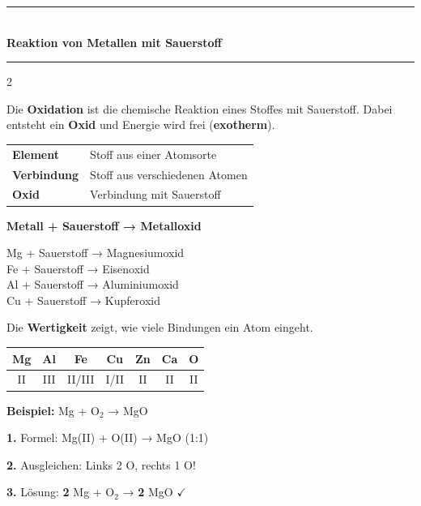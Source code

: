 \documentclass[9pt, a4paper]{article}
\newcommand{\seitentitel}[1]{%
    \noindent\textcolor{fachfarbe}{\rule{\textwidth}{1.5pt}}\\[-0.1em]
    {\Large\bfseries\textcolor{fachfarbe}{#1}}\\[-0.3em]
    \textcolor{fachfarbe}{\rule{\textwidth}{0.4pt}}
    \vspace{0.3em}
}
\newcommand{\abschnitt}[1]{%
    \vspace{6pt}%
    \noindent{\normalsize\bfseries\textcolor{fachfarbe}{#1}}%
    \vspace{2pt}%
    \nopagebreak[4]%
}
\begin{document}

\seitentitel{Reaktion von Metallen mit Sauerstoff}

\begin{multicols}{2}

\abschnitt{Was ist Oxidation?}

Die \textbf{Oxidation} ist die chemische Reaktion eines Stoffes mit Sauerstoff. Dabei entsteht ein \textbf{Oxid} und Energie wird frei (\textbf{exotherm}).

\vspace{4pt}
\begin{tabular}{@{}ll@{}}
\textbf{Element} & Stoff aus einer Atomsorte \\
\textbf{Verbindung} & Stoff aus verschiedenen Atomen \\
\textbf{Oxid} & Verbindung mit Sauerstoff \\
\end{tabular}

\abschnitt{Wortgleichungen}

\begin{formelkasten}
\centering
\textbf{Metall + Sauerstoff → Metalloxid}
\end{formelkasten}

\vspace{2pt}
\small
Mg + Sauerstoff → Magnesiumoxid\\
Fe + Sauerstoff → Eisenoxid\\
Al + Sauerstoff → Aluminiumoxid\\
Cu + Sauerstoff → Kupferoxid

\columnbreak

\abschnitt{Wertigkeiten}

Die \textbf{Wertigkeit} zeigt, wie viele Bindungen ein Atom eingeht.

\vspace{4pt}
\begin{center}
\small
\begin{tabular}{|c|c|c|c|c|c|c|}
\hline
\textbf{Mg} & \textbf{Al} & \textbf{Fe} & \textbf{Cu} & \textbf{Zn} & \textbf{Ca} & \textbf{O} \\
\hline
II & III & II/III & I/II & II & II & II \\
\hline
\end{tabular}
\end{center}

\abschnitt{Formelgleichung aufstellen}

\textbf{Beispiel:} Mg + O$_2$ → MgO

\textbf{1.} Formel: Mg(II) + O(II) → MgO (1:1)

\textbf{2.} Ausgleichen: Links 2 O, rechts 1 O!

\textbf{3.} Lösung: \textbf{2} Mg + O$_2$ → \textbf{2} MgO $\checkmark$

\end{multicols}
\end{document}
